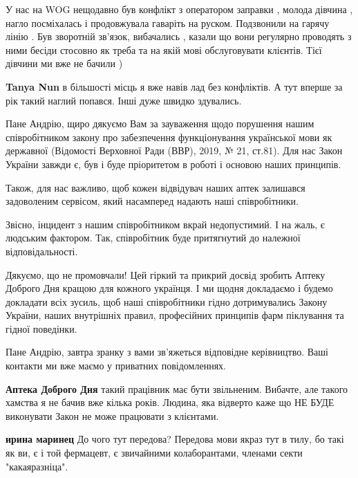 \begin{itemize}
\begin{itemize}
\end{itemize} %


У нас на WOG нещодавно був конфлікт з оператором заправки , молода дівчина ,
нагло посміхалась і продовжувала гаваріть на руском. Подзвонили на гарячу лінію
. Був зворотній зв'язок, вибачались , казали що вони регулярно проводять з ними
бесіди стосовно як треба та на якій мові обслуговувати клієнтів. Тієї дівчини
ми вже не бачили )

\begin{itemize} %
\textbf{Tanya Nun} в більшості місць я вже навів лад без конфліктів.
А тут вперше за рік такий наглий попався. Інші дуже швидко здувались.
\end{itemize} %


Пане Андрію, щиро дякуємо Вам за зауваження щодо порушення нашим співробітником
закону про забезпечення функціонування української мови як державної (Відомості
Верховної Ради (ВВР), 2019, № 21, ст.81). Для нас Закон України завжди є, був і
буде пріоритетом в роботі і основою наших принципів.

Також, для нас важливо, щоб кожен відвідувач наших аптек залишався задоволеним
сервісом, який насамперед надають наші співробітники.

Звісно, інцидент з нашим співробітником вкрай недопустимий. І на жаль, є
людським фактором. Так, співробітник буде притягнутий до належної
відповідальності.

Дякуємо, що не промовчали! Цей гіркий та прикрий досвід зробить Аптеку Доброго
Дня кращою для кожного українця. І ми щодня докладаємо і будемо докладати всіх
зусиль, щоб наші співробітники гідно дотримувались Закону України, наших
внутрішніх правил, професійних принципів фарм піклування та гідної поведінки.

\begin{itemize} %
Пане Андрію, завтра зранку з вами зв’яжеться відповідне керівництво. Ваші контакти ми вже маємо у приватних повідомленнях.


\textbf{Аптека Доброго Дня} такий працівник має бути звільненим.
Вибачте, але такого хамства я не бачив вже кілька років.
Людина, яка відверто каже що НЕ БУДЕ виконувати Закон не може працювати з клієнтами.

\textbf{ирина маринец} До чого тут передова? Передова мови якраз тут в тилу, бо такі як ви, є і той фермацевт, є звичайними колаборантами, членами секти "какаяразніца".


\end{itemize}
\end{itemize}
